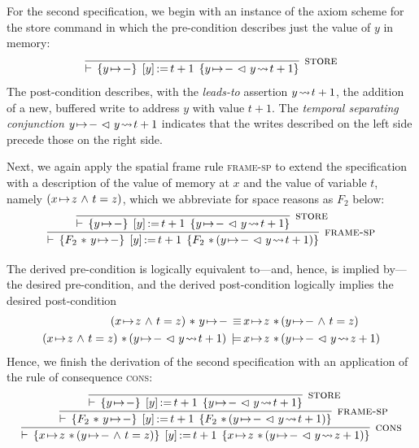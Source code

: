 \documentclass[11pt]{report}         %
\begin{document}
For the second specification, we begin with an instance of the axiom scheme for the store command in which the pre-condition describes just the value of $y$ in memory: \[ \infer[\textsc{store}]{\triple{y \fpointsto -}{\cstore{y}{t+1}}{y \fpointsto - \fseq y \fwriteu t+1}}{}\] The post-condition describes, with the \emph{leads-to} assertion $y \!\leadsto\!  t+1$, the addition of a new, buffered write to address $y$ with value $t+1$. The \emph{temporal separating conjunction} $y \!\mapsto\! - \operatorname{\,\vartriangleleft\,} y \!\leadsto\! t+1$ indicates that the writes described on the left side precede those on the right side.

Next, we again apply the spatial frame rule \textsc{frame-sp} to extend the specification with a description of the value of memory at $x$ and the value of variable $t$, namely $(x \!\mapsto\! z \operatorname{\,\wedge\,} t = z)$, which we abbreviate for space reasons as $F_2$ below:  
\[ \infer[\textsc{frame-sp}]{\triple{F_2 \fsep y \fpointsto -}{\cstore{y}{t+1}}{F_2 \fsep (y \fpointsto - \fseq y \fwriteu t+1)}}{
  \infer[\textsc{store}]{\triple{y \fpointsto -}{\cstore{y}{t+1}}{y \fpointsto - \fseq y \fwriteu t+1}}{}
  } \]

The derived pre-condition is logically equivalent to---and, hence, is implied by---the desired pre-condition, and the derived post-condition logically implies the desired post-condition \begin{align*}
(x \fpointsto z \conj t = z) \fsep y \fpointsto - \sequiv & x \fpointsto z \fsep (y \fpointsto - \conj t = z)\\ 
(x \fpointsto z \conj t = z) \fsep (y \fpointsto - \fseq y \fwriteu t+1) \sentails & x \fpointsto z \fsep (y \fpointsto - \fseq y \fwriteu z+1)
\end{align*} Hence, we finish the derivation of the second specification with an application of the rule of consequence \textsc{cons}: 
\[ \infer[\textsc{cons}]{\triple{x \fpointsto z \fsep (y \fpointsto - \conj t = z)}{\cstore{y}{t+1}}{x \fpointsto z \fsep (y \fpointsto - \fseq y \fwriteu z+1)}}{\infer[\textsc{frame-sp}]{\triple{F_2 \fsep y \fpointsto -}{\cstore{y}{t+1}}{F_2 \fsep (y \fpointsto - \fseq y \fwriteu t+1)}}{
  \infer[\textsc{store}]{\triple{y \fpointsto -}{\cstore{y}{t+1}}{y \fpointsto - \fseq y \fwriteu t+1}}{}
  }}
 \]
\end{document}
